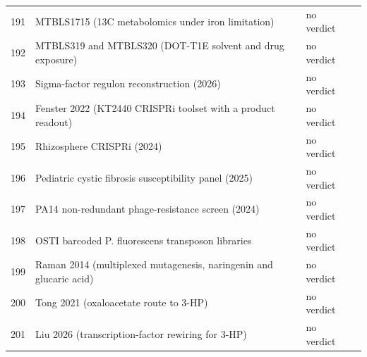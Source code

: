 \begin{longtable}{@{}r L{76mm} L{20mm} L{36mm} L{24mm}@{}}
191 & MTBLS1715 (13C metabolomics under iron limitation) &  & no verdict &  \\
192 & MTBLS319 and MTBLS320 (DOT-T1E solvent and drug exposure) &  & no verdict &  \\
193 & Sigma-factor regulon reconstruction (2026) &  & no verdict &  \\
194 & Fenster 2022 (KT2440 CRISPRi toolset with a product readout) &  & no verdict &  \\
195 & Rhizosphere CRISPRi (2024) &  & no verdict &  \\
196 & Pediatric cystic fibrosis susceptibility panel (2025) &  & no verdict &  \\
197 & PA14 non-redundant phage-resistance screen (2024) &  & no verdict &  \\
198 & OSTI barcoded P. fluorescens transposon libraries &  & no verdict &  \\
199 & Raman 2014 (multiplexed mutagenesis, naringenin and glucaric acid) &  & no verdict &  \\
200 & Tong 2021 (oxaloacetate route to 3-HP) &  & no verdict &  \\
201 & Liu 2026 (transcription-factor rewiring for 3-HP) &  & no verdict &  \\
\end{longtable}
\endgroup
